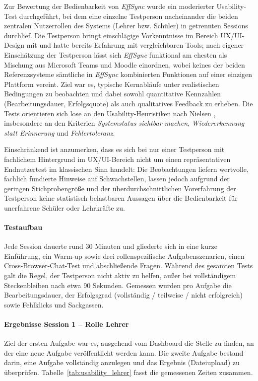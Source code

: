 \label{sec:usability_test}

Zur Bewertung der Bedienbarkeit von \textit{EffSync} wurde ein moderierter Usability-Test durchgeführt, bei dem eine einzelne Testperson nacheinander die beiden zentralen Nutzerrollen des Systems (Lehrer bzw. Schüler) in getrennten Sessions durchlief. Die Testperson bringt einschlägige Vorkenntnisse im Bereich UX/UI-Design mit und hatte bereits Erfahrung mit vergleichbaren Tools; nach eigener Einschätzung der Testperson lässt sich \textit{EffSync} funktional am ehesten als Mischung aus Microsoft Teams und Moodle einordnen, wobei keines der beiden Referenzsysteme sämtliche in \textit{EffSync} kombinierten Funktionen auf einer einzigen Plattform vereint. Ziel war es, typische Kernabläufe unter realistischen Bedingungen zu beobachten und dabei sowohl quantitative Kennzahlen (Bearbeitungsdauer, Erfolgsquote) als auch qualitatives Feedback zu erheben. Die Tests orientieren sich lose an den Usability-Heuristiken nach Nielsen \cite{nielsen_heuristics}, insbesondere an den Kriterien \textit{Systemstatus sichtbar machen}, \textit{Wiedererkennung statt Erinnerung} und \textit{Fehlertoleranz}.

Einschränkend ist anzumerken, dass es sich bei nur einer Testperson mit fachlichem Hintergrund im UX/UI-Bereich nicht um einen repräsentativen Endnutzertest im klassischen Sinn handelt: Die Beobachtungen liefern wertvolle, fachlich fundierte Hinweise auf Schwachstellen, lassen jedoch aufgrund der geringen Stichprobengröße und der überdurchschnittlichen Vorerfahrung der Testperson keine statistisch belastbaren Aussagen über die Bedienbarkeit für unerfahrene Schüler oder Lehrkräfte zu.

\paragraph{Testaufbau}
Jede Session dauerte rund 30 Minuten und gliederte sich in eine kurze Einführung, ein Warm-up sowie drei rollenspezifische Aufgabenszenarien, einen Cross-Browser-Chat-Test und abschließende Fragen. Während des gesamten Tests galt die Regel, der Testperson nicht aktiv zu helfen, außer bei vollständigem Steckenbleiben nach etwa 90 Sekunden. Gemessen wurden pro Aufgabe die Bearbeitungsdauer, der Erfolgsgrad (vollständig / teilweise / nicht erfolgreich) sowie Fehlklicks und Sackgassen.

\paragraph{Ergebnisse Session 1 -- Rolle Lehrer}
Ziel der ersten Aufgabe war es, ausgehend vom Dashboard die Stelle zu finden, an der eine neue Aufgabe veröffentlicht werden kann. Die zweite Aufgabe bestand darin, eine Aufgabe vollständig anzulegen und das Ergebnis (Dateiupload) zu überprüfen. Tabelle~\ref{tab:usability_lehrer} fasst die gemessenen Zeiten zusammen.

